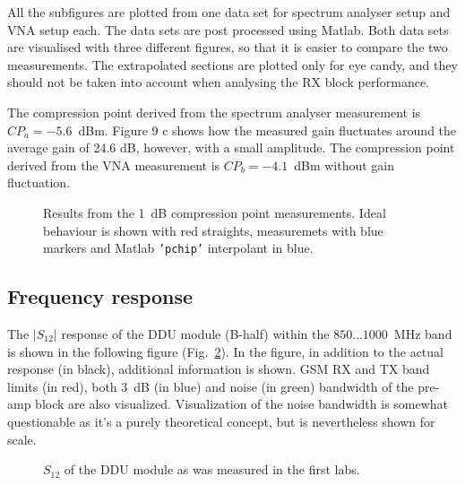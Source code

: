 \documentclass[a4paper, 12pt]{article}
\begin{document}
All the subfigures are plotted from one data set for spectrum analyser setup and VNA setup each. The data sets are post processed using Matlab. Both data sets are visualised with three different figures, so that it is easier to compare the two measurements. The extrapolated sections are plotted only for eye candy, and they should not be taken into account when analysing the RX block performance.

The compression point derived from the spectrum analyser measurement is $CP_a = -5.6$~dBm. Figure 9 c shows how the measured gain fluctuates around the average gain of 24.6 dB, however, with a small amplitude. The compression point derived from the VNA measurement is $CP_b = -4.1$~dBm without gain fluctuation.


\begin{figure}
\centering
{}
\caption{Results from the 1~dB compression point measurements. Ideal behaviour is shown with red straights, 
	measuremets with blue markers and Matlab \texttt{'pchip'} interpolant in blue.}\label{f:1dB}
\end{figure}

\newpage
\subsection{Frequency response}

The $|S_{12}|$ response of the DDU module (B-half) within the $850 \ldots 1000$~MHz band 
is shown in the following figure (Fig.~\ref{f:s12}). In the figure, in addition to the 
actual response (in black), additional information is shown. GSM RX and TX band limits 
(in red), both 3~dB (in blue) and noise (in green) bandwidth of the pre-amp block are also 
visualized. Visualization of the noise bandwidth is somewhat questionable as it's a purely 
theoretical concept, but is nevertheless shown for scale. 

\begin{figure}[h!]
	\begin{center}
	\caption{$S_{12}$ of the DDU module as was measured in the first labs.}
	\label{f:s12}
	\end{center}
	\vspace*{-12pt}
\end{figure}
\end{document}

